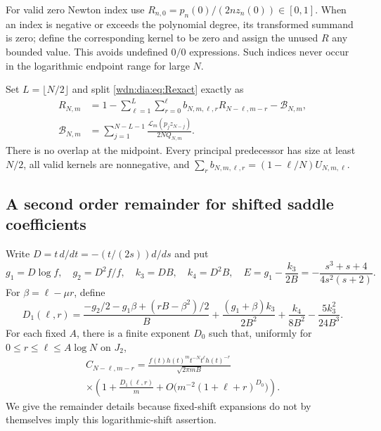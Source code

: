 \documentclass[11pt,letterpaper]{article}
\theoremstyle{remark}\newtheorem{remark}[theorem]{Remark}
\newcommand{\LL}{\mathcal L}
\begin{document}
For valid zero Newton index use $R_{n,0}=p_n(0)/(2nz_n(0))\in[0,1]$.
When an index is negative or exceeds the polynomial degree, its transformed
summand is zero; define the corresponding kernel to be zero and assign the
unused $R$ any bounded value. This avoids undefined $0/0$ expressions.
Such indices never occur in the logarithmic endpoint range for large $N$.

Set $L=\lfloor N/2\rfloor$ and split \eqref{wdn:dia:eq:Rexact} exactly as
\begin{align}
 R_{N,m}&=1-\sum_{\ell=1}^L\sum_{r=0}^{\ell}
 b_{N,m,\ell,r}R_{N-\ell,m-r}-\mathcal B_{N,m},\label{wdn:dia:eq:causal}\\
 \mathcal B_{N,m}&=\sum_{j=1}^{N-L-1}
 \frac{\LL_m(p_jz_{N-j})}{2NQ_{N,m}}.\label{wdn:dia:eq:Bopp}
\end{align}
There is no overlap at the midpoint. Every principal predecessor has size
at least $N/2$, all valid kernels are nonnegative, and
$\sum_r b_{N,m,\ell,r}=(1-\ell/N)U_{N,m,\ell}$.

\subsection{A second order remainder for shifted saddle coefficients}
Write $D=t\,d/dt=-(t/(2s))d/ds$ and put
\begin{equation}\label{wdn:dia:eq:cumulants}
 g_1=D\log f,\quad g_2=D^2f/f,\quad k_3=DB,\quad k_4=D^2B,
 \quad E=g_1-\frac{k_3}{2B}=-\frac{s^3+s+4}{4s^2(s+2)}.
\end{equation}
For $\beta=\ell-\mu r$, define
\begin{equation}\label{wdn:dia:eq:D1}
 D_1(\ell,r)=
 \frac{-g_2/2-g_1\beta+(rB-\beta^2)/2}{B}
 +\frac{(g_1+\beta)k_3}{2B^2}
 +\frac{k_4}{8B^2}-\frac{5k_3^2}{24B^3}.
\end{equation}
For each fixed $A$, there is a finite exponent $D_0$ such that, uniformly
for $0\le r\le\ell\le A\log N$ on $J_2$,
\begin{multline}\label{wdn:dia:eq:shiftsecond}
 C_{N-\ell,m-r}=
 \frac{f(t)h(t)^mt^{-N}t^\ell h(t)^{-r}}{\sqrt{2\pi mB}}
 \\\times\left(1+\frac{D_1(\ell,r)}m
       +O\bigl(m^{-2}(1+\ell+r)^{D_0}\bigr)\right).
\end{multline}
We give the remainder details because fixed-shift expansions do not
by themselves imply this logarithmic-shift assertion.
\end{document}
